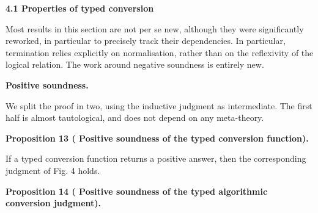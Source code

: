 \documentclass[10pt,a4paper]{amsart}
\begin{document}
 
 


 
\par\medskip\noindent\textbf{4.1 Properties of typed conversion}\par
 
 
Most results in this section are not per se new, although they were significantly reworked, in particular to precisely track their dependencies. In particular, termination relies explicitly on normalisation, rather than on the reflexivity of the logical relation. The work around negative soundness is entirely new.\par
 
 
 
\par\medskip\noindent\textbf{Positive soundness.}\par
 
 
We split the proof in two, using the inductive judgment as intermediate. The first half is almost tautological, and does not depend on any meta-theory.\par
 
 
 
\par\medskip\noindent\textbf{Proposition 13 (  Positive soundness of the typed conversion function).}\par
 
 
If a typed conversion function returns a positive answer, then the corresponding judgment of Fig. 4 holds.\par
 
 
 
 
\par\medskip\noindent\textbf{Proposition 14 (  Positive soundness of the typed algorithmic conversion judgment).}\par
 
 
\end{document}
